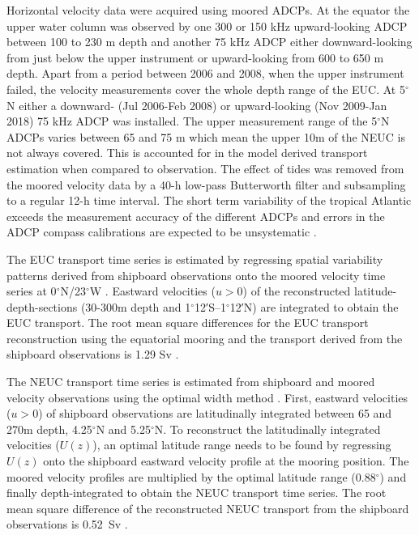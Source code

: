 \documentclass[os, manuscript]{copernicus}
\begin{document}
Horizontal velocity data were acquired using moored ADCPs. At the equator the upper water column was observed by one 300 or 150 kHz upward-looking ADCP between 100 to 230 m depth and another 75 kHz ADCP either downward-looking from just below the upper instrument or upward-looking from 600 to 650 m depth. Apart from a period between 2006 and 2008, when the upper instrument failed, the velocity measurements cover the whole depth range of the EUC. At 5$^{\circ}$N either a downward- (Jul 2006-Feb 2008) or upward-looking (Nov 2009-Jan 2018) 75 kHz ADCP was installed. The upper measurement range of the 5$^{\circ}$N ADCPs varies between 65 and 75 m which mean the upper 10m of the NEUC is not always covered. This is accounted for in the model derived transport estimation when compared to observation. The effect of tides was removed from the moored velocity data by a 40-h low-pass Butterworth filter and subsampling to a regular 12-h time interval. The short term variability of the tropical Atlantic exceeds the measurement accuracy of the different ADCPs and errors in the ADCP compass calibrations are expected to be unsystematic \citep{Brandt2021a}. 

The EUC transport time series is estimated by regressing spatial variability patterns derived from shipboard observations onto the moored velocity time series at 0$^{\circ}$N/23$^{\circ}$W \citep{Brandt2014, Brandt2016, Brandt2021a}. Eastward velocities ($ u>0 $) of the reconstructed latitude-depth-sections (30-300m depth and 1$^{\circ}$12′S–1$^{\circ}$12′N) are integrated to obtain the EUC transport. The root mean square differences for the EUC transport reconstruction using the equatorial mooring and the transport derived from the shipboard observations is 1.29 Sv \citep{Brandt2014}.

The NEUC transport time series is estimated from shipboard and moored velocity observations using the optimal width method \citep{Burmeister2020}. First, eastward velocities ($ u>0 $) of shipboard observations are latitudinally integrated between 65 and 270m depth, 4.25$^{\circ}$N and 5.25$^{\circ}$N. To reconstruct the latitudinally integrated velocities ($ U(z) $), an optimal latitude range needs to be found by regressing $ U(z) $ onto the shipboard eastward velocity profile at the mooring position. The moored velocity profiles are multiplied by the optimal latitude range (0.88$^{\circ}$) and finally depth-integrated to obtain the NEUC transport time series. The root mean square difference of the reconstructed NEUC transport from the shipboard observations is 0.52 $\,$Sv \citep{Burmeister2020}.
\end{document}
